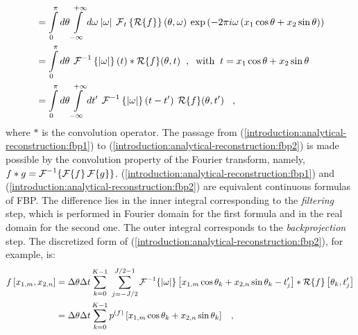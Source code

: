 {\begin{align}
                              &= \int\limits_{0}^{\pi}d\theta\int\limits_{-\infty}^{+\infty} d\omega\:|\omega| \: \operatorname{\mathcal{F}}_{t}\left\{\operatorname{\mathcal{R}}\{f\}\right\}\left(\theta,\omega\right)\:\exp\left(-2\pi i\omega\left(x_{1}\cos\theta + x_{2}\sin\theta\right)\right) 
                                  \label{introduction:analytical-reconstruction:fbp1}\\
                              &= \int\limits_{0}^{\pi}d\theta\:\operatorname{\mathcal{F}}^{-1}\left\{|\omega|\right\}(t) \ast \operatorname{\mathcal{R}}\{f\}(\theta,t) \hspace{0.2cm},\;\;\text{with} \hspace{0.2cm} t = x_{1}\cos\theta + x_{2}\sin\theta
                                  \label{introduction:analytical-reconstruction:fbp2} \\                            
                              &= \int\limits_{0}^{\pi}d\theta\int\limits_{-\infty}^{+\infty} dt'\:\operatorname{\mathcal{F}}^{-1}\left\{|\omega|\right\}(t-t') \: \operatorname{\mathcal{R}}\{f\}(\theta,t') \hspace{0.3cm},
                                  \nonumber
\end{align}
where $\ast$ is the convolution operator. The passage from (\ref{introduction:analytical-reconstruction:fbp1}) to
(\ref{introduction:analytical-reconstruction:fbp2}) is made possible by the convolution property of the Fourier transform,
namely, $f \ast g = \operatorname{\mathcal{F}}^{-1}\{ \operatorname{\mathcal{F}}\{ f \} \operatorname{\mathcal{F}}\{ g \} \}$.
(\ref{introduction:analytical-reconstruction:fbp1}) and (\ref{introduction:analytical-reconstruction:fbp2})
are equivalent continuous formulas of FBP. The difference lies in the inner integral corresponding to the \emph{filtering} step,
which is performed in Fourier domain for the first formula and in the real domain for the second one. The outer integral corresponds
to the \emph{backprojection} step.
\newline
The discretized form of (\ref{introduction:analytical-reconstruction:fbp2}), for example, is:
\begin{equation}
\begin{split}
  f\left[x_{1,m},x_{2,n}\right] &= \Delta\theta\Delta t \sum\limits_{k=0}^{K-1} \; \sum\limits_{j=-J/2}^{J/2-1} \Four^{-1}\{|\omega|\}
                  \left[x_{1,m}\cos\theta_{k} + x_{2,n}\sin\theta_{k} - t_{j}'\right] \ast \Radon\{f\}\left[\theta_{k},t_{j}'\right] \\
                  &= \Delta\theta\Delta t \sum\limits_{k=0}^{K-1} p^{(f)}\left[ x_{1,m}\cos\theta_{k} + x_{2,n}\sin\theta_{k} \right] \hspace{0.3cm},

\end{split}
\end{equation}}
